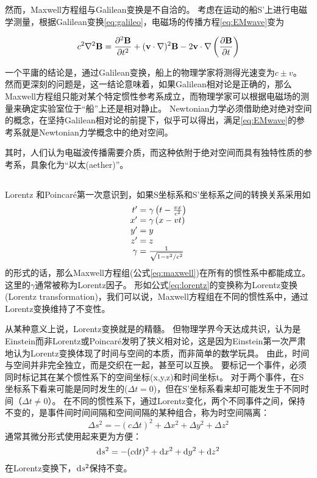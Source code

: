 然而，Maxwell方程组与Galilean变换是不自洽的。
考虑在运动的船S'上进行电磁学测量，根据Galilean变换\ref{eq:galileo}，电磁场的传播方程\ref{eq:EMwave}变为

\begin{equation}
c^2\nabla^2 \textbf B = \frac{\partial^2 \textbf B}{\partial t^2} + (\textbf v \cdot \nabla)^2 \textbf B - 2 \textbf v \cdot \nabla \left(\frac{\partial \textbf B}{\partial t}\right)
\end{equation}

一个平庸的结论是，通过Galilean变换，船上的物理学家将测得光速变为$c\pm v$。
然而更深刻的问题是，这一结论意味着，如果Galilean相对论是正确的，那么Maxwell方程组只能对某个特定惯性参考系成立，而物理学家可以根据电磁场的测量来确定实验室位于“船”上还是相对静止。
Newtonian力学必须借助绝对绝对空间的概念，在坚持Galilean相对论的前提下，似乎可以得出，满足\ref{eq:EMwave}的参考系就是Newtonian力学概念中的绝对空间。

其时，人们认为电磁波传播需要介质，而这种依附于绝对空间而具有独特性质的参考系，具象化为“以太(aether)”\cite{EleDyn1997}。

\subsection{\SR}
Lorentz 和Poincar{\'e}第一次意识到，如果S坐标系和S'坐标系之间的转换关系采用如
\begin{equation}
\begin{array}{r@{}l}
t'&{}=\gamma \left(t-{\frac {vx}{c^{2}}}\right)\\
x'&{}=\gamma \left(x-vt\right)\\
y'&{}=y\\
z'&{}=z\\
  \gamma &{}= \frac{1}{{\sqrt {1-v^{2}/c^{2}}}}
\end{array}\label{eq:lorentz}
\end{equation}
的形式的话，那么Maxwell方程组(公式\ref{eq:maxwell})在所有的惯性系中都能成立。
这里的$\gamma$通常被称为Lorentz因子。
形如公式\ref{eq:lorentz}的变换称为Lorentz变换(Lorentz transformation)，我们可以说，Maxwell方程组在不同的惯性系中，通过Lorentz变换维持了不变性。

从某种意义上说，Lorentz变换就是\SR 的精髓。
但物理学界今天达成共识，认为是Einstein而非Lorentz或Poincar{\'e}发明了狭义相对论，这是因为Einstein第一次严肃地认为Lorentz变换体现了时间与空间的本质，而非简单的数学玩具。
由此，时间与空间并非完全独立，而是交织在一起，甚至可以互换。
要标记一个事件，必须同时标记其在某个惯性系下的空间坐标(x,y,z)和时间坐标t。
对于两个事件，在S坐标系下看来可能是同时发生的($\Delta t=0$)，但在S'坐标系看来却可能发生于不同时间（$\Delta t \neq 0$）。
在不同的惯性系下，通过Lorentz变化，两个不同事件之间，保持不变的，是事件间时间间隔和空间间隔的某种组合，称为时空间隔离：
\begin{equation}\label{eq:STinterval}
  \Delta s^2 = - (c\Delta t)^2+ \Delta x ^2 + \Delta y^2+ \Delta z^2
\end{equation}
通常其微分形式使用起来更为方便：
\begin{equation}\label{eq:STinterval_diff}
  {\rm d}s^2 = - (c{\rm d}t)^2+ {\rm d}x ^2 + {\rm d} y^2+ {\rm d} z^2
\end{equation}
在Lorentz变换下，${\rm d}s^2$保持不变。


